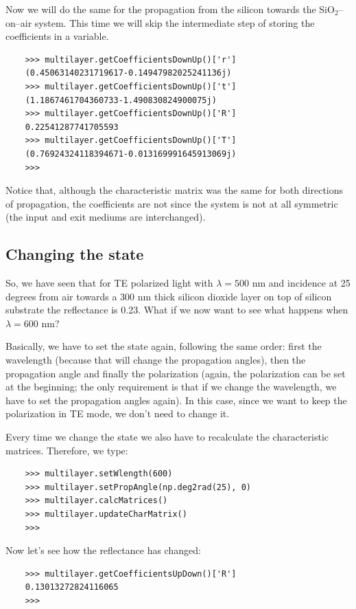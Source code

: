 \documentclass[a4paper,11pt,aps,final]{revtex4}
\begin{document}
Now we will do the same for the propagation from the silicon towards the SiO$_2$--on--air system. This time we will skip the intermediate step of storing the coefficients in a variable.
\begin{verbatim}
    >>> multilayer.getCoefficientsDownUp()['r']
    (0.45063140231719617-0.14947982025241136j)
    >>> multilayer.getCoefficientsDownUp()['t']
    (1.1867461704360733-1.490830824900075j)
    >>> multilayer.getCoefficientsDownUp()['R']
    0.22541287741705593
    >>> multilayer.getCoefficientsDownUp()['T']
    (0.76924324118394671-0.013169991645913069j)
    >>>
\end{verbatim}

Notice that, although the characteristic matrix was the same for both directions of propagation, the coefficients are not since the system is not at all symmetric (the input and exit mediums are interchanged).

\subsection{Changing the state}
So, we have seen that for TE polarized light with $\lambda = 500$ nm and incidence at 25 degrees from air towards a 300 nm thick silicon dioxide layer on top of silicon substrate the reflectance is 0.23. What if we now want to see what happens when $\lambda = 600$ nm?

Basically, we have to set the state again, following the same order: first the wavelength (because that will change the propagation angles), then the propagation angle and finally the polarization (again, the polarization can be set at the beginning; the only requirement is that if we change the wavelength, we have to set the propagation angles again). In this case, since we want to keep the polarization in TE mode, we don't need to change it.

Every time we change the state we also have to recalculate the characteristic matrices. Therefore, we type:
\begin{verbatim}
    >>> multilayer.setWlength(600)
    >>> multilayer.setPropAngle(np.deg2rad(25), 0)
    >>> multilayer.calcMatrices()
    >>> multilayer.updateCharMatrix()
    >>>
\end{verbatim}

Now let's see how the reflectance has changed:
\begin{verbatim}
    >>> multilayer.getCoefficientsUpDown()['R']
    0.13013272824116065
    >>>
\end{verbatim}
\end{document}
